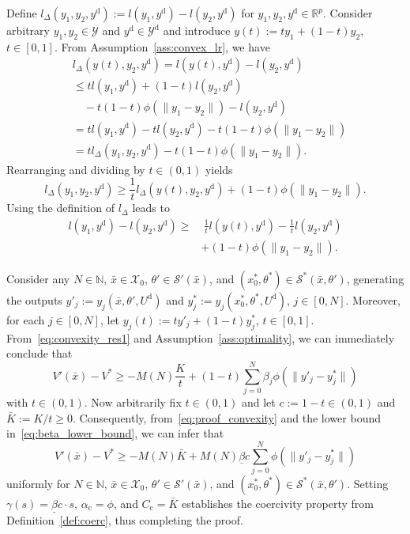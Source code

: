 \documentclass[a4paper,fleqn]{cas-dc}
\begin{document}
\begin{pf}
	Define ${l}_\Delta(y_1,y_2,y^\mathrm{d}):= l(y_1,y^\mathrm{d}) - l(y_2,y^\mathrm{d})$ for $y_1,y_2,y^\mathrm{d}\in\mathbb{R}^p$.
	Consider arbitrary $y_1,y_2\in\mathcal{Y}$ and $y^\mathrm{d}\in\mathcal{Y}^\mathrm{d}$ and introduce $y(t) := ty_1 + (1-t)y_2$, $t\in[0,1]$.
	From Assumption~\ref{ass:convex_lr}, we have
	\begin{align*}
		&l_\Delta(y(t),y_2,y^\mathrm{d}) = l(y(t),y^\mathrm{d}) - l(y_2,y^\mathrm{d}) \\
		&\leq tl(y_1,y^\mathrm{d})+(1-t)l(y_2,y^\mathrm{d}) \\
		&\quad - t(1-t)\phi(\|y_1-y_2\|) - l(y_2,y^\mathrm{d})\\
		&= tl(y_1,y^\mathrm{d})-tl(y_2,y^\mathrm{d}) - t(1-t)\phi(\|y_1-y_2\|)\\
		&= tl_\Delta(y_1,y_2,y^\mathrm{d}) - t(1-t)\phi(\|y_1-y_2\|).
	\end{align*}
	Rearranging and dividing by $t\in(0,1)$ yields
	\begin{equation*}
		l_\Delta(y_1,y_2,y^\mathrm{d})  \geq \frac{1}{t}l_\Delta(y(t),y_2,y^\mathrm{d}) + (1-t)\phi(\|y_1-y_2\|).
	\end{equation*}
	Using the definition of $l_\Delta$ leads to
	\begin{equation}
		\begin{split}\label{eq:convexity_res1}
		l(y_1,y^\mathrm{d}) - l(y_2,y^\mathrm{d})
		\geq &\ \frac{1}{t}l(y(t),y^\mathrm{d}) - \frac{1}{t}l(y_2,y^\mathrm{d}) \\
		&+(1-t)\phi(\|y_1-y_2\|).
		\end{split}
	\end{equation}

	Consider any $N\in\mathbb{N}$, $\bar{x}\in\mathcal{X}_0$, $\theta'\in\mathcal{S}'(\bar{x})$, and $(x_0^*,{\theta}^*)\in\mathcal{S}^*(\bar{x},\theta')$, generating the outputs $y'_j:=y_j(\bar{x},{\theta}',U^\mathrm{d})$ and ${y}_j^*:=y_j({x}^*_0,{\theta}^*,U^\mathrm{d})$, $j\in[0,N]$. Moreover, for each $j\in[0,N]$, let ${y}_j(t) := ty'_j + (1-t)y^*_j$, $t\in[0,1]$. From~\eqref{eq:convexity_res1} and Assumption~\ref{ass:optimality}, we can immediately conclude that
	\begin{equation}
		V'(\bar{x}) - V^* \geq -M(N)\frac{K}{t} + (1-t)\sum_{j=0}^N\beta_j\phi(\|y'_j-{y}^*_j\|)\label{eq:proof_convexity}
	\end{equation}
	with $t\in(0,1)$.
	Now arbitrarily fix $t\in(0,1)$ and let $c:=1-t\in(0,1)$ and $\bar{K}:=K/t\geq0$. Consequently, from~\eqref{eq:proof_convexity} and the lower bound in~\eqref{eq:beta_lower_bound}, we can infer that
	\begin{equation*}
		V'(\bar{x}) - V^* \geq -M(N)\bar{K} +  M(N)\underline{\beta}c\sum_{j=0}^N\phi(\|y'_j-{y}^*_j\|)\label{eq:proof_convexity_2}
	\end{equation*}
	uniformly for $N\in\mathbb{N}$, $\bar{x}\in\mathcal{X}_0$, $\theta'\in\mathcal{S}'(\bar{x})$, and $(x_0^*,{\theta}^*)\in\mathcal{S}^*(\bar{x},\theta')$.
	Setting $\gamma(s) = \underline{\beta}c\cdot s$, $\alpha_\mathrm{c} = \phi$, and $C_\mathrm{c}= \bar{K}$ establishes the coercivity property from Definition~\ref{def:coerc}, thus completing the proof.
\end{pf}
\end{document}
